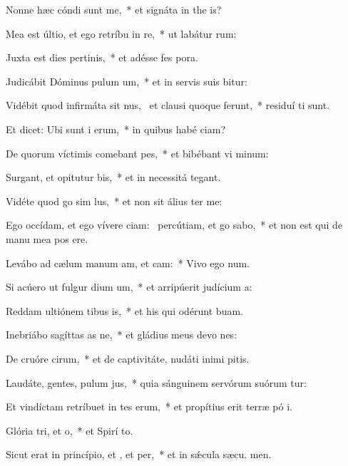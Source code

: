 \item Nonne hæc cóndi sunt  me,~* et signáta in the is?
\item Mea est últio, et ego retríbu in re,~* ut labátur  rum:
\item Juxta est dies pertinis,~* et adésse fes pora.
\item Judicábit Dóminus pulum um,~* et in servis suis bitur:
\item Vidébit quod infirmáta sit nus,~\pscross{} et clausi quoque ferunt,~* residuí ti sunt.
\item Et dicet: Ubi sunt i erum,~* in quibus habé ciam?
\item De quorum víctimis comebant pes,~* et bibébant vi minum:
\item Surgant, et opitutur bis,~* et in necessitá  tegant.
\item Vidéte quod go sim lus,~* et non sit álius  ter me:
\item Ego occídam, et ego vívere ciam:~\pscross{} percútiam, et go sabo,~* et non est qui de manu mea pos ere.
\item Levábo ad cælum manum am, et cam:~* Vivo ego  num.
\item Si acúero ut fulgur dium um,~* et arripúerit judícium  a:
\item Reddam ultiónem tibus is,~* et his qui odérunt  buam.
\item Inebriábo sagíttas as ne,~* et gládius meus devo nes:
\item De cruóre cirum,~* et de captivitáte, nudáti inimi pitis.
\item Laudáte, gentes, pulum jus,~* quia sánguinem servórum suórum tur:
\item Et vindíctam retríbuet in tes erum,~* et propítius erit terræ pó i.
\item \singlecolsep
\item Glória tri, et o,~* et Spirí to.
\item Sicut erat in princípio, et , et per,~* et in sǽcula sæcu. men.

